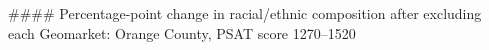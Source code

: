 #### Percentage-point change in racial/ethnic composition after excluding each Geomarket: Orange County, PSAT score 1270–1520
